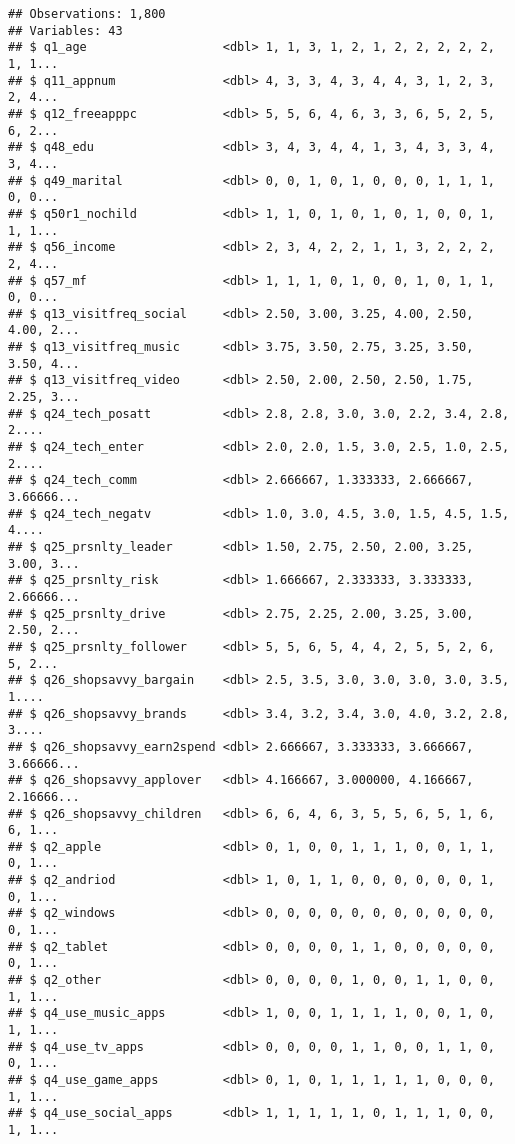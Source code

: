 \documentclass[]{article}
\begin{document}
\begin{verbatim}
## Observations: 1,800
## Variables: 43
## $ q1_age                   <dbl> 1, 1, 3, 1, 2, 1, 2, 2, 2, 2, 2, 1, 1...
## $ q11_appnum               <dbl> 4, 3, 3, 4, 3, 4, 4, 3, 1, 2, 3, 2, 4...
## $ q12_freeapppc            <dbl> 5, 5, 6, 4, 6, 3, 3, 6, 5, 2, 5, 6, 2...
## $ q48_edu                  <dbl> 3, 4, 3, 4, 4, 1, 3, 4, 3, 3, 4, 3, 4...
## $ q49_marital              <dbl> 0, 0, 1, 0, 1, 0, 0, 0, 1, 1, 1, 0, 0...
## $ q50r1_nochild            <dbl> 1, 1, 0, 1, 0, 1, 0, 1, 0, 0, 1, 1, 1...
## $ q56_income               <dbl> 2, 3, 4, 2, 2, 1, 1, 3, 2, 2, 2, 2, 4...
## $ q57_mf                   <dbl> 1, 1, 1, 0, 1, 0, 0, 1, 0, 1, 1, 0, 0...
## $ q13_visitfreq_social     <dbl> 2.50, 3.00, 3.25, 4.00, 2.50, 4.00, 2...
## $ q13_visitfreq_music      <dbl> 3.75, 3.50, 2.75, 3.25, 3.50, 3.50, 4...
## $ q13_visitfreq_video      <dbl> 2.50, 2.00, 2.50, 2.50, 1.75, 2.25, 3...
## $ q24_tech_posatt          <dbl> 2.8, 2.8, 3.0, 3.0, 2.2, 3.4, 2.8, 2....
## $ q24_tech_enter           <dbl> 2.0, 2.0, 1.5, 3.0, 2.5, 1.0, 2.5, 2....
## $ q24_tech_comm            <dbl> 2.666667, 1.333333, 2.666667, 3.66666...
## $ q24_tech_negatv          <dbl> 1.0, 3.0, 4.5, 3.0, 1.5, 4.5, 1.5, 4....
## $ q25_prsnlty_leader       <dbl> 1.50, 2.75, 2.50, 2.00, 3.25, 3.00, 3...
## $ q25_prsnlty_risk         <dbl> 1.666667, 2.333333, 3.333333, 2.66666...
## $ q25_prsnlty_drive        <dbl> 2.75, 2.25, 2.00, 3.25, 3.00, 2.50, 2...
## $ q25_prsnlty_follower     <dbl> 5, 5, 6, 5, 4, 4, 2, 5, 5, 2, 6, 5, 2...
## $ q26_shopsavvy_bargain    <dbl> 2.5, 3.5, 3.0, 3.0, 3.0, 3.0, 3.5, 1....
## $ q26_shopsavvy_brands     <dbl> 3.4, 3.2, 3.4, 3.0, 4.0, 3.2, 2.8, 3....
## $ q26_shopsavvy_earn2spend <dbl> 2.666667, 3.333333, 3.666667, 3.66666...
## $ q26_shopsavvy_applover   <dbl> 4.166667, 3.000000, 4.166667, 2.16666...
## $ q26_shopsavvy_children   <dbl> 6, 6, 4, 6, 3, 5, 5, 6, 5, 1, 6, 6, 1...
## $ q2_apple                 <dbl> 0, 1, 0, 0, 1, 1, 1, 0, 0, 1, 1, 0, 1...
## $ q2_andriod               <dbl> 1, 0, 1, 1, 0, 0, 0, 0, 0, 0, 1, 0, 1...
## $ q2_windows               <dbl> 0, 0, 0, 0, 0, 0, 0, 0, 0, 0, 0, 0, 1...
## $ q2_tablet                <dbl> 0, 0, 0, 0, 1, 1, 0, 0, 0, 0, 0, 0, 1...
## $ q2_other                 <dbl> 0, 0, 0, 0, 1, 0, 0, 1, 1, 0, 0, 1, 1...
## $ q4_use_music_apps        <dbl> 1, 0, 0, 1, 1, 1, 1, 0, 0, 1, 0, 1, 1...
## $ q4_use_tv_apps           <dbl> 0, 0, 0, 0, 1, 1, 0, 0, 1, 1, 0, 0, 1...
## $ q4_use_game_apps         <dbl> 0, 1, 0, 1, 1, 1, 1, 1, 0, 0, 0, 1, 1...
## $ q4_use_social_apps       <dbl> 1, 1, 1, 1, 1, 0, 1, 1, 1, 0, 0, 1, 1...

\end{verbatim}
\end{document}
